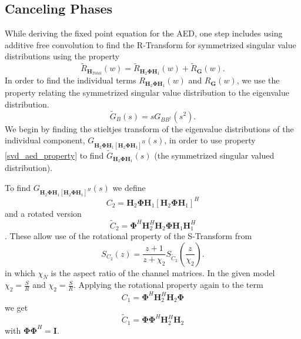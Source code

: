 \documentclass[12pt,a4paper]{report}
\begin{document}
\subsection{Canceling Phases}
While deriving the fixed point equation for the AED, one step includes using additive free convolution to find the R-Transform for symmetrized singular value distributions using the property 
\begin{equation}
\tilde{R}_{\mathbf{H}_{Total}}(w) = \tilde{R}_{\mathbf{H}_{2}\boldsymbol{\Phi}\mathbf{H}_{1}}(w) + \tilde{R}_{\mathbf{G}}(w).
\end{equation} In order to find the individual terms $R_{\mathbf{H}_{2}\boldsymbol{\Phi}\mathbf{H}_{1}}(w)$ and $R_{\mathbf{G}}(w)$, we use the property relating the symmetrized singular value distribution to the eigenvalue distribution.
\begin{equation}\label{svd_aed_property}
\tilde{G}_{B}(s) = sG_{BB^{\dagger}}(s^2).
\end{equation}
We begin by finding the stieltjes transform of the eigenvalue distributions of the individual component,
$G_{\mathbf{H}_{2}\boldsymbol{\Phi}\mathbf{H}_{1}[\mathbf{H}_{2}\boldsymbol{\Phi}\mathbf{H}_{1}]^H}(s)$, in order to use property \eqref{svd_aed_property} to find $\tilde{G}_{\mathbf{H}_{2}\boldsymbol{\Phi}\mathbf{H}_{1}}(s)$ (the symmetrized singular valued distribution).
\par
To find $G_{\mathbf{H}_{2}\boldsymbol{\Phi}\mathbf{H}_{1}[\mathbf{H}_{2}\boldsymbol{\Phi}\mathbf{H}_{1}]^H}(s)$ we define
\begin{equation}
C_2 = \mathbf{H}_{2}\boldsymbol{\Phi}\mathbf{H}_{1}[\mathbf{H}_{2}\boldsymbol{\Phi}\mathbf{H}_{1}]^H
\end{equation}
and a rotated version 
\begin{equation}
\tilde{C}_2 = \boldsymbol{\Phi}^H\mathbf{H}_{2}^H\mathbf{H}_{2}\boldsymbol{\Phi}\mathbf{H}_{1}\mathbf{H}_{1}^H
\end{equation}. 
These allow use of the rotational property of the S-Transform from \cite{muller2002asymptotic}
\begin{equation}\label{rotation_property}
S_{C_2}(z) = \frac{z+1}{z+\chi_2} S_{\tilde{C}_2}(\frac{z}{\chi_2}).
\end{equation}
in which $\chi_N$ is the aspect ratio of the channel matrices. In the given model $\chi_2 = \frac{S}{R}$ and
$\chi_2 = \frac{S}{R}$.
Applying the rotational property again to the term 
\begin{equation}
C_{1} = \boldsymbol{\Phi}^H\mathbf{H}_{2}^H\mathbf{H}_{2}\boldsymbol{\Phi}
\end{equation}
we get 
\begin{equation}
\tilde{C}_{1} = \boldsymbol{\Phi}\boldsymbol{\Phi}^H\mathbf{H}_{2}^H\mathbf{H}_{2}
\end{equation}
with $\boldsymbol{\Phi}\boldsymbol{\Phi}^H = \mathbf{I}$.
\end{document}

